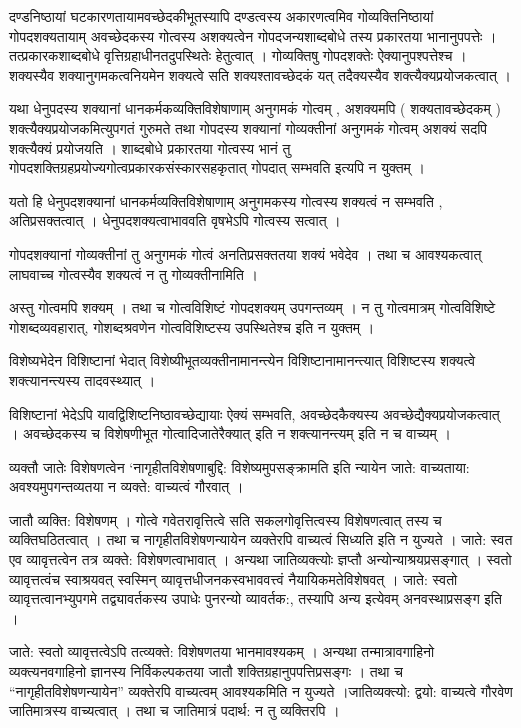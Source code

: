 दण्डनिष्ठायां घटकारणतायामवच्छेदकीभूतस्यापि दण्डत्वस्य अकारणत्वमिव गोव्यक्तिनिष्ठायां गोपदशक्यतायाम् अवच्छेदकस्य गोत्वस्य अशक्यत्वेन गोपदजन्यशाब्दबोधे तस्य प्रकारतया भानानुपपत्तेः । तत्प्रकारकशाब्दबोधे वृत्तिग्रहाधीनतदुपस्थितेः हेतुत्वात् । गोव्यक्तिषु गोपदशक्तेः ऐक्यानुपश्पत्तेश्च । शक्यस्यैव शक्यानुगमकत्वनियमेन शक्यत्वे सति शक्यश्तावच्छेदकं यत् तदैक्यस्यैव शक्त्यैक्यप्रयोजकत्वात् ।

यथा धेनुपदस्य शक्यानां धानकर्मकव्यक्तिविशेषाणाम् अनुगमकं गोत्वम् , अशक्यमपि ( शक्यतावच्छेदकम् ) शक्त्यैक्यप्रयोजकमित्युपगतं गुरुमते तथा गोपदस्य शक्यानां गोव्यक्तीनां अनुगमकं गोत्वम् अशक्यं सदपि शक्त्यैक्यं प्रयोजयति । शाब्दबोधे प्रकारतया गोत्वस्य भानं तु गोपदशक्तिग्रहप्रयोज्यगोत्वप्रकारकसंस्कारसहकृतात् गोपदात् सम्भवति इत्यपि न युक्तम् ।

यतो हि धेनुपदशक्यानां धानकर्मव्यक्तिविशेषाणाम् अनुगमकस्य गोत्वस्य शक्यत्वं न सम्भवति , अतिप्रसक्तत्वात् । धेनुपदशक्यत्वाभाववति वृषभेऽपि गोत्वस्य सत्वात् ।

गोपदशक्यानां गोव्यक्तीनां तु अनुगमकं गोत्वं अनतिप्रसक्ततया शक्यं भवेदेव । तथा च आवश्यकत्वात् लाघवाच्च गोत्वस्यैव शक्यत्वं न तु गोव्यक्तीनामिति ।

अस्तु गोत्वमपि शक्यम् । तथा च गोत्वविशिष्टं गोपदशक्यम् उपगन्तव्यम् । न तु गोत्वमात्रम् गोत्वविशिष्टे गोशब्दव्यवहारात्, गोशब्दश्रवणेन गोत्वविशिष्टस्य उपस्थितेश्च इति न युक्तम् ।

विशेष्यभेदेन विशिष्टानां भेदात् विशेष्यीभूतव्यक्तीनामानन्त्येन विशिष्टानामानन्त्यात् विशिष्टस्य शक्यत्वे शक्त्यानन्त्यस्य तादवस्थ्यात् ।

विशिष्टानां भेदेऽपि यावद्विशिष्टनिष्ठावच्छेद्यायाः ऐक्यं सम्भवति, अवच्छेदकैक्यस्य अवच्छेद्यैक्यप्रयोजकत्वात् । अवच्छेदकस्य च विशेषणीभूत गोत्वादिजातेरैक्यात् इति न शक्त्यानन्त्यम् इति न च वाच्यम् ।

व्यक्तौ जातेः विशेषणत्वेन ‘नागृहीतविशेषणाबुद्दि: विशेष्यमुपसङ्क्रामति इति न्यायेन जाते: वाच्यताया: अवश्यमुपगन्तव्यतया न व्यक्ते: वाच्यत्वं गौरवात् ।

जातौ व्यक्ति: विशेषणम् । गोत्वे गवेतरावृत्तित्वे सति सकलगोवृत्तित्वस्य विशेषणत्वात् तस्य च व्यक्तिघठितत्वात् । तथा च नागृहीतविशेषणन्यायेन व्यक्तेरपि वाच्यत्वं सिध्यति इति न युज्यते । जाते: स्वत एव व्यावृत्तत्वेन तत्र व्यक्ते: विशेषणत्वाभावात् । अन्यथा जातिव्यक्त्योः ज्ञप्तौ अन्योन्याश्रयप्रसङ्गात् । स्वतो व्यावृत्तत्वंच स्वाश्रयवत् स्वस्मिन् व्यावृत्तधीजनकस्वभाववत्त्वं नैयायिकमतेविशेषवत् । जाते: स्वतो व्यावृत्तत्वानभ्युपगमे तद्व्यावर्तकस्य उपाधेः पुनरन्यो व्यावर्तक:, तस्यापि अन्य इत्येवम् अनवस्थाप्रसङ्ग इति ।

जाते: स्वतो व्यावृत्तत्वेऽपि तत्व्यक्ते: विशेषणतया भानमावश्यकम् । अन्यथा तन्मात्रावगाहिनो व्यक्त्यनवगाहिनो ज्ञानस्य निर्विकल्पकतया जातौ शक्तिग्रहानुपपत्तिप्रसङ्गः । तथा च “नागृहीतविशेषणन्यायेन” व्यक्तेरपि वाच्यत्वम् आवश्यकमिति न युज्यते ।जातिव्यक्त्यो: द्वयो: वाच्यत्वे गौरवेण जातिमात्रस्य वाच्यत्वात् । तथा च जातिमात्रं पदार्थ: न तु व्यक्तिरपि ।

